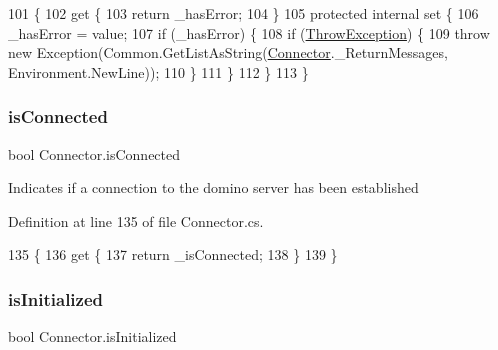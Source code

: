 \begin{DoxyCode}
101                                 \{
102         \textcolor{keyword}{get} \{
103             \textcolor{keywordflow}{return} \_hasError;
104         \}
105         \textcolor{keyword}{protected} \textcolor{keyword}{internal} \textcolor{keyword}{set} \{
106             \_hasError = value;
107             \textcolor{keywordflow}{if} (\_hasError) \{
108                 \textcolor{keywordflow}{if} (\mbox{\hyperlink{class_connector_a8ec0dcdbb4a85a56fa50f67686484c19}{ThrowException}}) \{
109                     \textcolor{keywordflow}{throw} \textcolor{keyword}{new} Exception(Common.GetListAsString(\mbox{\hyperlink{class_connector}{Connector}}.\_ReturnMessages, 
      Environment.NewLine));
110                 \}
111             \}
112         \}
113     \}
\end{DoxyCode}
\mbox{\label{class_connector_acf2c3b519c360d02ed54543a01d199af}} 
\subsubsection{\texorpdfstring{is\+Connected}{isConnected}}
{\footnotesize\ttfamily bool Connector.\+is\+Connected\hspace{0.3cm}{\ttfamily [get]}}



Indicates if a connection to the domino server has been established 



Definition at line 135 of file Connector.\+cs.


\begin{DoxyCode}
135                             \{
136         \textcolor{keyword}{get} \{
137             \textcolor{keywordflow}{return} \_isConnected;
138         \}
139     \}
\end{DoxyCode}
\mbox{\label{class_connector_a017d40b1f4cf2cbaa5d4b755cf09269e}} 
\subsubsection{\texorpdfstring{is\+Initialized}{isInitialized}}
{\footnotesize\ttfamily bool Connector.\+is\+Initialized\hspace{0.3cm}{\ttfamily [get]}}



